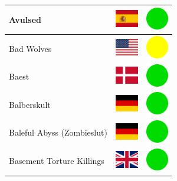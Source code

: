 \documentclass[12pt, a4paper, twoside]{report}
\begin{document}
\begin{center}
\begin{longtable}{|p{5cm}|p{2cm}|p{2cm}|}
Avulsed & \includegraphics[width=1cm]{4x3/es} & \includegraphics[width=1cm]{likes/y} \\ \hline
Bad Wolves & \includegraphics[width=1cm]{4x3/us} & \includegraphics[width=1cm]{likes/m} \\ \hline
Baest & \includegraphics[width=1cm]{4x3/dk} & \includegraphics[width=1cm]{likes/y} \\ \hline
Balberskult & \includegraphics[width=1cm]{4x3/de} & \includegraphics[width=1cm]{likes/y} \\ \hline
Baleful Abyss (Zombieslut) & \includegraphics[width=1cm]{4x3/de} & \includegraphics[width=1cm]{likes/y} \\ \hline
Basement Torture Killings & \includegraphics[width=1cm]{4x3/gb} & \includegraphics[width=1cm]{likes/y} \\ \hline

\end{longtable}
\end{center}
\end{document}
